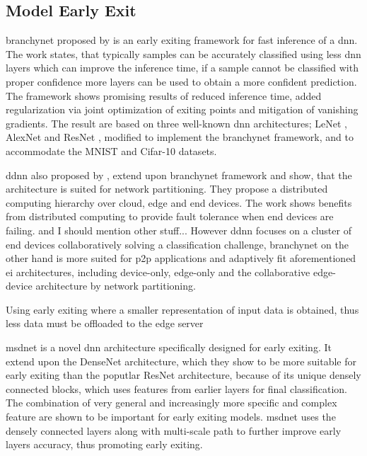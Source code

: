 \subsection{Model Early Exit}

\gls{branchynet} \cite{teerapittayanon_branchynet:_2016} proposed by \citeauthor{teerapittayanon_branchynet:_2016} is an early exiting framework for fast inference of a \gls{dnn}. The work states, that typically samples can be accurately classified using less \gls{dnn} layers which can improve the inference time, if a sample cannot be classified with proper confidence more layers can be used to obtain a more confident prediction. The framework shows promising results of reduced inference time, added regularization via joint optimization of exiting points and mitigation of vanishing gradients. The result are based on three well-known \gls{dnn} architectures; LeNet \cite{lecun_lecun-98.pdf_1998}, AlexNet \cite{krizhevsky_imagenet_2017} and ResNet \cite{he_deep_2015}, modified to implement the \gls{branchynet} framework, and to accommodate the MNIST \cite{lecun_mnist_2010} and Cifar-10 \cite{krizhevsky_cifar-10_nodate} datasets.  

\gls{ddnn} \cite{teerapittayanon_distributed_2017} also proposed by \citeauthor{teerapittayanon_distributed_2017}, extend upon \gls{branchynet} framework and show, that the architecture is suited for network partitioning. They propose a distributed computing hierarchy over cloud, edge and end devices. The work shows benefits from distributed computing to provide fault tolerance when end devices are failing. and I should mention other stuff... However \gls{ddnn} focuses on a cluster of end devices collaboratively solving a classification challenge, \gls{branchynet} on the other hand is more suited for \gls{p2p} applications and adaptively fit aforementioned \gls{ei} architectures, including device-only, edge-only and the collaborative edge-device architecture by network partitioning.


Using early exiting where a smaller representation of input data is obtained, thus less data must be offloaded to the edge server

\gls{msdnet} \cite{huang_multi-scale_2017} is a novel \gls{dnn} architecture specifically designed for early exiting. It extend upon the DenseNet \cite{huang_densely_2016} architecture, which they show to be more suitable for early exiting than the poputlar ResNet architecture, because of its unique densely connected blocks, which uses features from earlier layers for final classification. The combination of very general and increasingly more specific and complex feature are shown to be important for early exiting models. \gls{msdnet} uses the densely connected layers along with multi-scale path to further improve early layers accuracy, thus promoting early exiting.